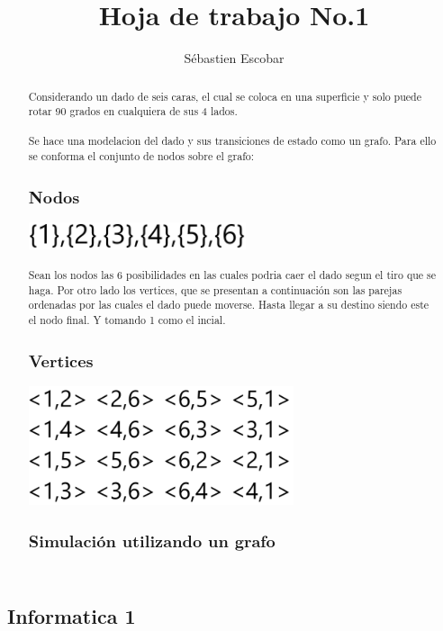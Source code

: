 \documentclass[11pt,letterpaper,twocolumn]{article}
\begin{document}
\title{Hoja de trabajo No.1}
\author{Sébastien Escobar}
\maketitle

\subsection*{Informatica 1}
\renewcommand{\abstractname}{Ejercicio No.2 Abstracción}

\begin{abstract}
Considerando un dado de seis caras, el cual se coloca en una superficie y solo puede rotar 90 grados en cualquiera de sus 4 lados.
\\
\\Se hace una modelacion del dado y sus transiciones de estado como un grafo.
Para ello se conforma el conjunto de nodos sobre el grafo:
\subsection*{Nodos}
\includegraphics[height=0.8cm]{nodos}
\\
\\Sean los nodos las 6 posibilidades en las cuales podria caer el dado segun el tiro que se haga. Por otro lado los vertices, que se presentan a continuación son las parejas ordenadas por las cuales el dado puede moverse. Hasta llegar a su destino siendo este el nodo final. Y tomando 1 como el incial.
\subsection*{Vertices}
\includegraphics[height=3.5cm]{vertices}

\subsection*{Simulación utilizando un grafo }

\end{abstract}
\end{document}
